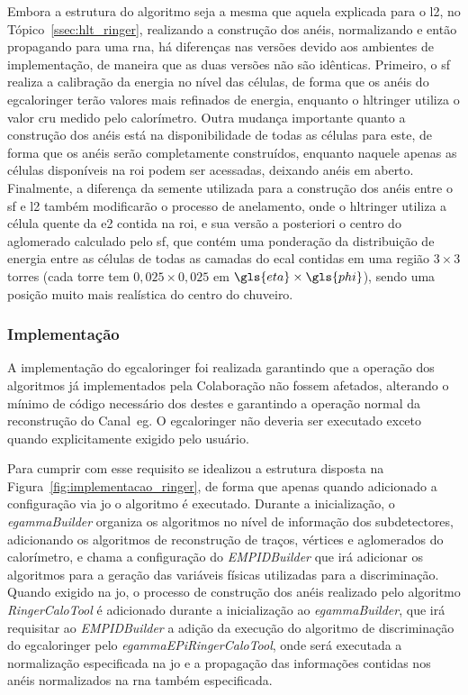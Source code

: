 Embora a estrutura do algoritmo seja a mesma que aquela explicada para o \gls{l2}, no
Tópico~\ref{ssec:hlt_ringer}, realizando a construção dos anéis, normalizando e
então propagando para uma \gls{rna}, há diferenças nas versões devido aos ambientes de implementação, 
de maneira que as duas versões não são idênticas. Primeiro, o \gls{sf} realiza a calibração da energia 
no nível das células, de forma que os anéis do \gls{egcaloringer} terão 
valores mais refinados de energia, enquanto o \gls{hltringer} utiliza o
valor cru medido pelo calorímetro. Outra mudança importante quanto a construção
dos anéis está na disponibilidade de todas as células para este, de forma que
os anéis serão completamente construídos, enquanto naquele apenas as
células disponíveis na \gls{roi} podem ser acessadas, deixando anéis em aberto. 
Finalmente, a diferença da semente utilizada para a construção dos anéis entre o \gls{sf} e \gls{l2}
também modificarão o processo de anelamento, onde o \gls{hltringer} utiliza
a célula quente da \gls{e2} contida na \gls{roi}, e sua versão a
posteriori o centro do aglomerado calculado pelo \gls{sf}, que contém uma ponderação da
distribuição de energia entre as células de todas as camadas do \gls{ecal}
contidas em uma região $3\times3$ torres (cada torre tem $0,025\times0,025$ em
$\gls{eta}\times\gls{phi}$), sendo uma posição muito mais realística 
do centro do chuveiro.


\subsubsection{Implementação}
\label{sssec:egringer_impl}

A implementação do \gls{egcaloringer} foi realizada garantindo que a operação
dos algoritmos já implementados pela Colaboração não fossem afetados, alterando
o mínimo de código necessário dos destes e garantindo a operação normal da
reconstrução do Canal~\gls{eg}. O \gls{egcaloringer} não deveria ser executado
exceto quando explicitamente exigido pelo usuário. 

Para cumprir com esse requisito se idealizou a 
estrutura disposta na Figura~\ref{fig:implementacao_ringer}, de forma que apenas
quando adicionado a configuração via \glsdesc{jo} o algoritmo é executado.
Durante a inicialização, o \emph{egammaBuilder} organiza os algoritmos no
nível de informação dos subdetectores, adicionando os algoritmos de reconstrução
de traços, vértices e aglomerados do calorímetro, e chama a configuração do
\emph{EMPIDBuilder} que irá adicionar os algoritmos para a geração das variáveis
físicas utilizadas para a discriminação. Quando exigido na \glsdesc{jo}, o
processo de construção dos anéis realizado pelo algoritmo \emph{RingerCaloTool} 
é adicionado durante a inicialização ao \emph{egammaBuilder}, 
que irá requisitar ao \emph{EMPIDBuilder} a adição da
execução do algoritmo de discriminação do \gls{egcaloringer} pelo
\emph{egammaEPiRingerCaloTool}, onde será executada a normalização especificada 
na \glsdesc{jo} e a propagação das informações contidas nos anéis normalizados 
na \gls{rna} também especificada. 

